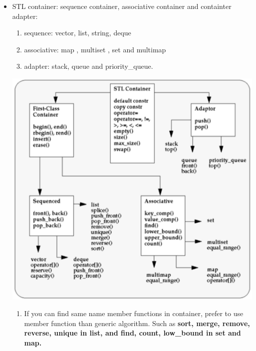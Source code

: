 \documentclass[a4paper,11pt,twoside]{book}
\begin{document}
\begin{itemize}

\item STL container: sequence container, associative container and containter adapter:
\begin{enumerate}
\item sequence: vector, list, string,  deque
\item associative: map , multiset , set and multimap
\item adapter: stack, queue and priority\_queue.
\end{enumerate}

\includegraphics[scale=0.6]{pics/container.png}

\begin{enumerate}
\item  If you can find same name member functions in container, prefer to use member function than generic algorithm. Such as \textbf{sort, merge, remove, reverse, unique in list, and find, count, low\_bound in set and map. }



\end{enumerate}
\end{itemize}
\end{document}
